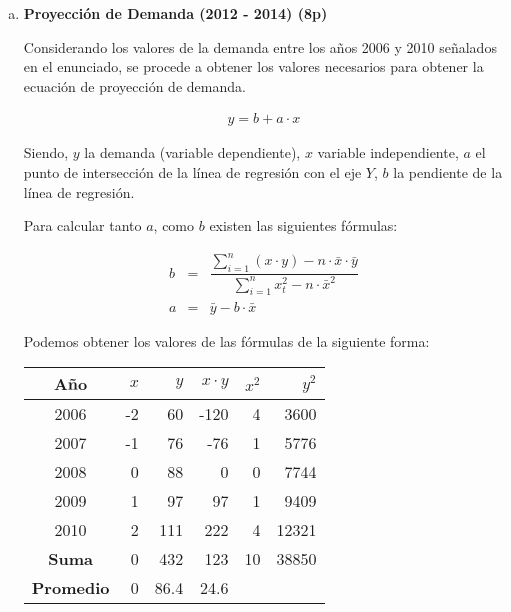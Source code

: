 %
%
\newpage
\begin{enumerate}[(a)]

    \item {\bf Proyección de Demanda (2012 - 2014) (8p)}


          Considerando los valores de la demanda entre los años 2006 y 2010 señalados
          en el enunciado, se procede a obtener los valores necesarios para obtener la ecuación
          de proyección de demanda.

          \begin{eqnarray}
              y = b + a\cdot x 
          \end{eqnarray}

          Siendo, $y$ la demanda (variable dependiente), $x$ variable independiente,
          $a$ el punto de intersección de la línea de regresión con el eje $Y$,
          $b$ la pendiente de la línea de regresión.

          Para calcular tanto $a$, como $b$ existen las siguientes fórmulas:

          \begin{eqnarray}
              b &=& \dfrac{\sum_{i=1}^{n} (x\cdot y) - n\cdot \bar{x}\cdot \bar{y}}{\sum_{i=1}^{n} x_{t}^{2} - n\cdot \bar{x}^{2}} \\
              a &=& \bar{y} - b\cdot \bar{x} 
          \end{eqnarray}

          Podemos obtener los valores de las fórmulas de la siguiente forma:

          \begin{table}[h!t]
            \centering
            \begin{tabular}{|c|r|r|r|r|r|}
                \hline
                {\bf Año}      & {\bf $x$} & {\bf $y$} & {\bf $x\cdot y$} & {\bf $x^{2}$} & {\bf $y^{2}$} \\ \hline
                2006           & -2      & 60      & -120           & 4             & 3600          \\
                2007           & -1      & 76      & -76            & 1             & 5776          \\
                2008           & 0       & 88      & 0              & 0             & 7744          \\
                2009           & 1       & 97      & 97             & 1             & 9409          \\
                2010           & 2       & 111     & 222            & 4             & 12321         \\ \hline
                {\bf Suma}     & 0       & 432     & 123            & 10            & 38850         \\ \hline
                {\bf Promedio} & 0       & 86.4    & 24.6           &               &               \\ \hline
            \end{tabular}
          \end{table}            


\end{enumerate}
